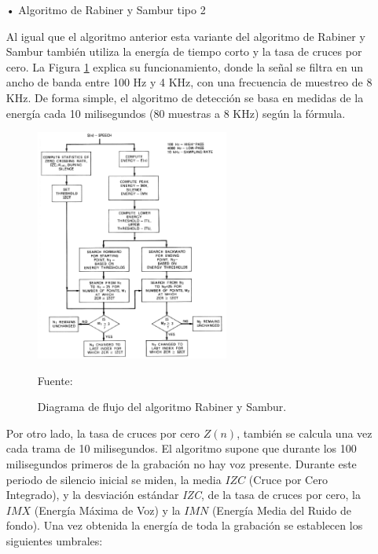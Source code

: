 \begin{enumerate}
\begin{enumerate}
\item[•]Algoritmo de Rabiner y Sambur tipo 2
\par
Al igual que el algoritmo anterior esta variante del algoritmo de Rabiner y Sambur también utiliza la energía de tiempo corto y la tasa de cruces por cero. La Figura \ref{fig:figura2.25} explica su funcionamiento, donde la señal se filtra en un ancho de banda entre 100 Hz y 4 KHz, con una frecuencia de muestreo de 8 KHz. De forma simple, el algoritmo de detección se basa en medidas de la energía cada 10 milisegundos (80 muestras a 8 KHz) según la fórmula.
\newpage
\begin{figure}[ht]
\begin{center}
\includegraphics[width=0.6\textwidth]{Imagenes/Cap2/image026}
\end{center}
\begin{center}
\vskip -0.5cm
\caption{\small{Diagrama de flujo del algoritmo Rabiner y Sambur.}}
\label{fig:figura2.25}
{\small{Fuente: \cite{rabiner}}}
\end{center}
\end{figure}

Por otro lado, la tasa de cruces por cero $Z(n)$, también se calcula una vez cada trama de 10 milisegundos. El algoritmo supone que durante los 100 milisegundos primeros de la grabación no hay voz presente. Durante este periodo de silencio inicial se miden, la media $IZC$ (Cruce por Cero Integrado), y la desviación estándar \textit{IZC}, de la tasa de cruces por cero, la $IMX$ (Energía Máxima de Voz) y la $IMN$ (Energía Media del Ruido de fondo). Una vez obtenida la energía de toda la grabación se establecen los siguientes umbrales:


\end{enumerate}
\end{enumerate}

